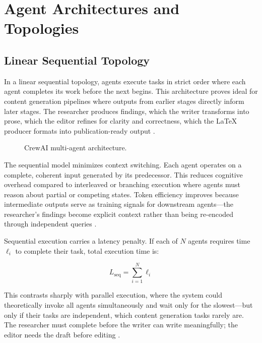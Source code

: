 \chapter{Agent Architectures and Topologies}\label{ch:architectures}

\section{Linear Sequential Topology}

In a linear sequential topology, agents execute tasks in strict order where each agent completes its work before the next begins. This architecture proves ideal for content generation pipelines where outputs from earlier stages directly inform later stages. The researcher produces findings, which the writer transforms into prose, which the editor refines for clarity and correctness, which the LaTeX producer formats into publication-ready output \cite{CrewAI2024}.

\begin{figure}[H]\centering\resizebox{\textwidth}{!}{}\caption{CrewAI multi-agent architecture.}\label{fig:crew_architecture}\end{figure}

The sequential model minimizes context switching. Each agent operates on a complete, coherent input generated by its predecessor. This reduces cognitive overhead compared to interleaved or branching execution where agents must reason about partial or competing states. Token efficiency improves because intermediate outputs serve as training signals for downstream agents—the researcher's findings become explicit context rather than being re-encoded through independent queries \cite{Segal2026}.

Sequential execution carries a latency penalty. If each of $N$ agents requires time $\ell_i$ to complete their task, total execution time is:

\begin{equation}
L_{\mathrm{seq}}=\sum_{i=1}^{N}\ell_i\label{eq:pipeline_latency}
\end{equation}

This contrasts sharply with parallel execution, where the system could theoretically invoke all agents simultaneously and wait only for the slowest—but only if their tasks are independent, which content generation tasks rarely are. The researcher must complete before the writer can write meaningfully; the editor needs the draft before editing \cite{CrewAI2024}.

